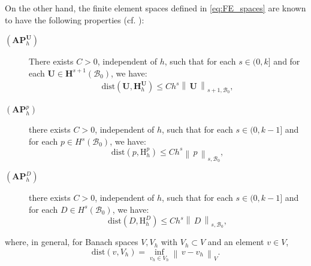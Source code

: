 \documentclass{sfuthesis}
\numberwithin{equation}{section}
\numberwithin{figure}{chapter}
\numberwithin{table}{chapter}
\theoremstyle{definition}
\def\*#1{{\mathbf{#1}}} %
\newcommand{\B}{\mathcal{B}}
\newcommand{\Hhu}{\mathbf{H}_h^{\*U}}
\newcommand{\Hhp}{\mathrm{H}_h^{p}}
\newcommand{\HhD}{\mathrm{H}_h^{D}}
\newcommand{\norm}[1]{{\left\| \, #1 \, \right\|}}
\begin{document}
On the other hand, the finite element spaces defined in \eqref{eq:FE_spaces} are known to have the following properties (cf. \cite{BoffiBrezziFortin2013,Gatica2014}):

\begin{description}
    \item[$(\mathbf{AP}_h^\*U)$] There exists $C>0$, independent of $h$, such that for each $s \in (0,k]$ and for each $\*U \in \*H^{s+1}(\B_0)$, we have:
    \begin{eqnarray}
        \mathrm{dist}(\*U,\Hhu) \leq C h^s \norm{\*U}_{s+1,\B_0},
    \end{eqnarray}
    \item[$(\mathbf{AP}_h^p)$] there exists $C>0$, independent of $h$, such that for each $s \in (0,k-1]$ and for each $p \in H^{s}(\B_0)$, we have:
    \begin{equation}
        \mathrm{dist}(p,\Hhp) \leq C h^s \norm{p}_{s,\B_0},
    \end{equation}
    \item[$(\mathbf{AP}_h^D)$] there exists $C>0$, independent of $h$, such that for each $s \in (0,k-1]$ and for each $D \in H^{s}(\B_0)$, we have:
    \begin{equation}
        \mathrm{dist}(D,\HhD) \leq C h^s \norm{D}_{s,\B_0},
    \end{equation}
\end{description}
where, in general, for Banach spaces $V,V_h$ with $V_h \subset V$ and an element $v \in V$, 
\[
    \mathrm{dist}(v, V_h) = \inf_{v_h \in V_h} \norm{v-v_h}_V.
\]
\end{document}
